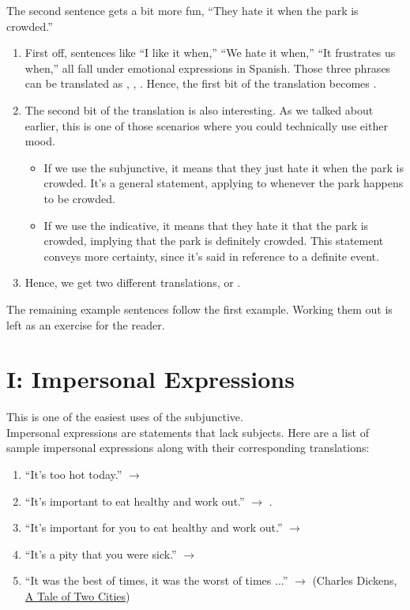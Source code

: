 The second sentence gets a bit more fun, ``They hate it when the park is crowded.''
\begin{enumerate}
	\item First off, sentences like ``I like it when,'' ``We hate it when,'' ``It frustrates us when,'' all fall under emotional expressions in Spanish. Those three phrases can be translated as , , . Hence, the first bit of the translation becomes .
	\item The second bit of the translation is also interesting. As we talked about earlier, this is one of those scenarios where you could technically use either mood. 
		\begin{itemize}
			\item If we use the subjunctive, it means that they just hate it when the park is crowded. It's a general statement, applying to whenever the park happens to be crowded. 
			\item If we use the indicative, it means that they hate it that the park is crowded, implying that the park is definitely crowded. This statement conveys more certainty, since it's said in reference to a definite event. 
		\end{itemize}
	\item Hence, we get two different translations,  or . 
\end{enumerate}

The remaining example sentences follow the first example. Working them out is left as an exercise for the reader. 
\section{I: Impersonal Expressions}
This is one of the easiest uses of the subjunctive. \\

Impersonal expressions are statements that lack subjects. Here are a list of sample impersonal expressions along with their corresponding translations:
\begin{enumerate}[noitemsep]
	\item ``It's too hot today.'' $\rightarrow$ 
	\item ``It's important to eat healthy and work out.'' $\rightarrow$ .
	\item ``It's important for you to eat healthy and work out.'' $\rightarrow$ 
	\item ``It's a pity that you were sick.'' $\rightarrow$ 
	\item ``It was the best of times, it was the worst of times ...'' $\rightarrow$  (Charles Dickens, \underline{A Tale of Two Cities})
\end{enumerate}

